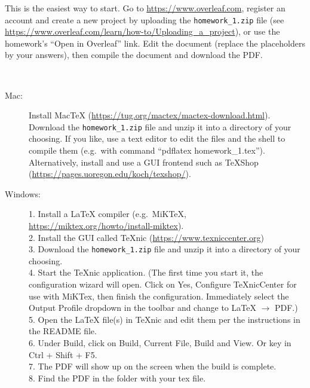 \begin{mylist}
\item[\bf Option 1: Online.]
This is the easiest way to start.
Go to \url{https://www.overleaf.com},  %
register an account and create a new project by uploading the \texttt{homework\_1.zip} file
(see {\url{https://www.overleaf.com/learn/how-to/Uploading_a_project}}),
or use the homework's ``Open in Overleaf'' link.
Edit the document (replace the placeholders by your answers), then compile the document and download the PDF.

\smallskip

\item[\bf Option 2: On your computer]~\small

  \begin{description}

\item[Mac:]

Install MacTeX (\url{https://tug.org/mactex/mactex-download.html}).
Download the \texttt{homework\_1.zip} file and unzip it into a directory of your choosing.
If you like, use a text editor to edit the files and the shell to compile them
(e.g.~with command ``pdflatex homework\_1.tex'').
Alternatively, install and use a GUI frontend such as TeXShop
(\url{https://pages.uoregon.edu/koch/texshop/}).

\item[Windows:]
1. Install a LaTeX compiler (e.g.~MiKTeX, \url{https://miktex.org/howto/install-miktex}).
\\2. Install the GUI called TeXnic (\url{https://www.texniccenter.org})
\\3. Download the \texttt{homework\_1.zip} file and unzip it into a directory of your choosing.
\\4. Start the TeXnic application.
(The first time you start it, the configuration wizard will open.  Click on Yes, Configure TeXnicCenter for use with MiKTex, then finish the configuration. Immediately select the Output Profile dropdown in the toolbar and change to LaTeX $\rightarrow$ PDF.)
\\5. Open the LaTeX file(s) in TeXnic and edit them per the instructions in the README file. 
\\6. Under Build, click on Build, Current File, Build and View.  Or key in Ctrl + Shift + F5.
\\7. The PDF will show up on the screen when the build is complete.
\\8. Find the PDF in the folder with your tex file.  


\end{description}
\end{mylist}
